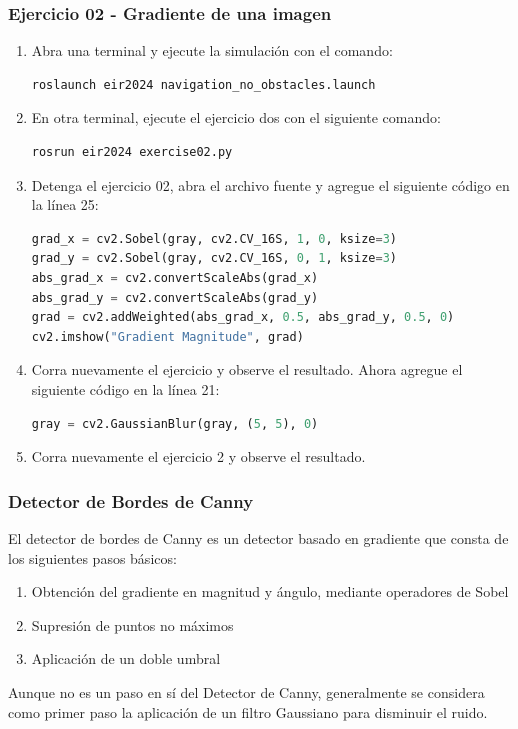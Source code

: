 \begin{frame}[containsverbatim]\frametitle{Ejercicio 02 - Gradiente de una imagen}
  \begin{enumerate}
  \item Abra una terminal y ejecute la simulación con el comando:
    \begin{lstlisting}[language=bash,numbers=none]
roslaunch eir2024 navigation_no_obstacles.launch
    \end{lstlisting}
  \item En otra terminal, ejecute el ejercicio dos con el siguiente comando:
    \begin{lstlisting}[language=bash,numbers=none]
rosrun eir2024 exercise02.py
    \end{lstlisting}
  \item Detenga el ejercicio 02, abra el archivo fuente y agregue el siguiente código en la línea 25:
    \begin{lstlisting}[language=Python,firstnumber=25]
grad_x = cv2.Sobel(gray, cv2.CV_16S, 1, 0, ksize=3)
grad_y = cv2.Sobel(gray, cv2.CV_16S, 0, 1, ksize=3)
abs_grad_x = cv2.convertScaleAbs(grad_x)
abs_grad_y = cv2.convertScaleAbs(grad_y)
grad = cv2.addWeighted(abs_grad_x, 0.5, abs_grad_y, 0.5, 0)
cv2.imshow("Gradient Magnitude", grad)
    \end{lstlisting}
  \item Corra nuevamente el ejercicio y observe el resultado. Ahora agregue el siguiente código en la línea 21:
    \begin{lstlisting}[language=Python,firstnumber=21]
gray = cv2.GaussianBlur(gray, (5, 5), 0)
    \end{lstlisting}
  \item Corra nuevamente el ejercicio 2 y observe el resultado. 
  \end{enumerate}
\end{frame}

\begin{frame}\frametitle{Detector de Bordes de Canny}
  El detector de bordes de Canny es un detector basado en gradiente que consta de los siguientes pasos básicos:
  \begin{enumerate}
  \item Obtención del gradiente en magnitud y ángulo, mediante operadores de Sobel
  \item Supresión de puntos no máximos
  \item Aplicación de un doble umbral
  \end{enumerate}
  Aunque no es un paso en sí del Detector de Canny, generalmente se considera como primer paso la aplicación de un filtro Gaussiano para disminuir el ruido. 
\end{frame}

